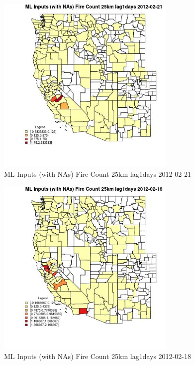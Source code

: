 \begin{figure} 
\centering  
\includegraphics[width=0.77\textwidth]{Code_Outputs/Report_ML_input_PM25_Step4_part_f_de_duplicated_aves_prioritize_24hr_obswNAs_CountyFire_Count_25km_lag1daysMean2012-02-21.jpg} 
\caption{\label{fig:Report_ML_input_PM25_Step4_part_f_de_duplicated_aves_prioritize_24hr_obswNAsCountyFire_Count_25km_lag1daysMean2012-02-21}ML Inputs (with NAs) Fire Count 25km lag1days 2012-02-21} 
\end{figure} 
 

\begin{figure} 
\centering  
\includegraphics[width=0.77\textwidth]{Code_Outputs/Report_ML_input_PM25_Step4_part_f_de_duplicated_aves_prioritize_24hr_obswNAs_CountyFire_Count_25km_lag1daysMean2012-02-18.jpg} 
\caption{\label{fig:Report_ML_input_PM25_Step4_part_f_de_duplicated_aves_prioritize_24hr_obswNAsCountyFire_Count_25km_lag1daysMean2012-02-18}ML Inputs (with NAs) Fire Count 25km lag1days 2012-02-18} 
\end{figure} 
 

